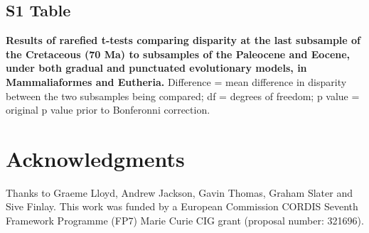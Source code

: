 \documentclass[10pt,letterpaper]{article}
\begin{document}
\subsection*{S1 Table}
\label{S1_Table}
{\bf Results of rarefied t-tests comparing disparity at the last subsample of the Cretaceous (70 Ma) to subsamples of the Paleocene and Eocene, under both gradual and punctuated evolutionary models, in Mammaliaformes and Eutheria.}
Difference = mean difference in disparity between the two subsamples being compared; df = degrees of freedom; p value = original p value prior to Bonferonni correction. 

\section*{Acknowledgments}
Thanks to Graeme Lloyd, Andrew Jackson, Gavin Thomas, Graham Slater and Sive Finlay.
This work was funded by a European Commission CORDIS Seventh Framework Programme (FP7) Marie Curie CIG grant (proposal number: 321696).

\nolinenumbers



\end{document}
